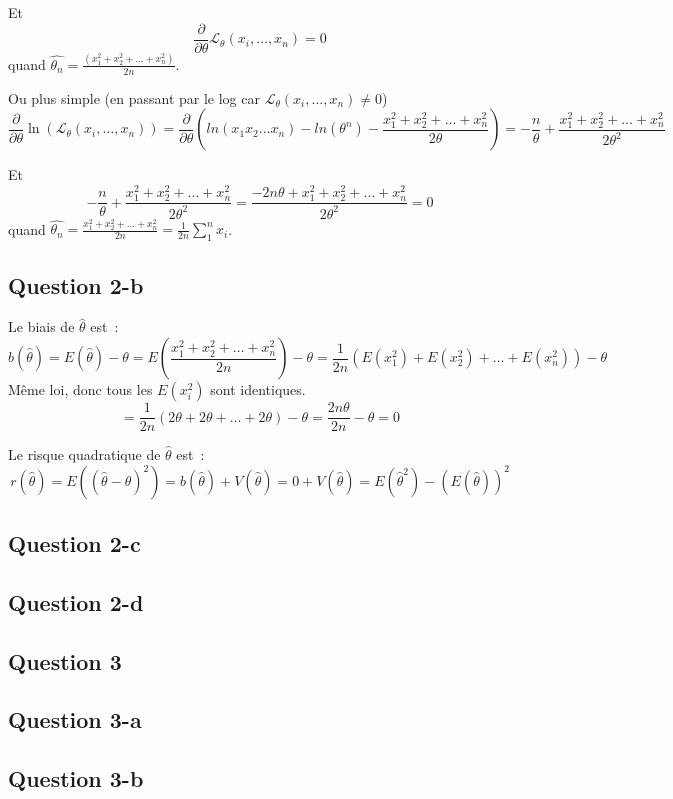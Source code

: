 \documentclass[]{book}
\theoremstyle{definition}
\begin{document}
Et
$$
\frac{\partial}{\partial \theta} \mathcal{L}_{\theta}(x_i,\ldots,x_n) = 0
$$
quand $\hat{\theta_n} = \frac{(x_1^2+x_2^2+\ldots + x_n^2)}{2n}$.

Ou plus simple (en passant par le log car $\mathcal{L}_{\theta}(x_i,\ldots,x_n) \neq 0$)
$$
\frac{\partial}{\partial \theta} \ln(\mathcal{L}_{\theta}(x_i,\ldots,x_n)) = \frac{\partial}{\partial \theta} \left( ln(x_1x_2 \ldots x_n) - ln(\theta^n)  -  \frac{x_1^2+x_2^2+ \ldots + x_n^2}{2\theta} \right) = -\frac{n}{\theta} + \frac{x_1^2+x_2^2+ \ldots + x_n^2}{2\theta^2}
$$

Et
$$
-\frac{n}{\theta}+\frac{x_1^2+x_2^2+ \ldots + x_n^2}{2\theta^2} = \frac{-2n\theta + x_1^2+x_2^2+ \ldots + x_n^2}{2\theta^2} = 0
$$
quand $\hat{\theta_n} = \frac{x_1^2+x_2^2+\ldots + x_n^2}{2n} = \frac{1}{2n} \sum_{1}^{n}{x_i}$.

\subsection*{Question 2-b}
Le biais de $\hat{\theta}$ est~:
$$
b(\hat{\theta}) = E(\hat{\theta}) - \theta = E\left(\frac{x_1^2+x_2^2+\ldots + x_n^2}{2n}\right) - \theta = \frac{1}{2n}(E(x_1^2) + E(x_2^2) + \ldots + E(x_n^2)) - \theta
$$
M\^eme loi, donc tous les $E(x_i^2)$ sont identiques. 
$$
=\frac{1}{2n}(2\theta + 2\theta + \ldots + 2\theta) - \theta = \frac{2n\theta}{2n} - \theta = 0
$$

Le risque quadratique de $\hat{\theta}$ est~:
$$
r(\hat{\theta}) = E((\hat{\theta} - \theta)^2) = b(\hat{\theta}) + V(\hat{\theta}) = 0 + V(\hat{\theta}) = E(\hat{\theta}^2) - (E(\hat{\theta}))^2
$$

\subsection*{Question 2-c}

\subsection*{Question 2-d}

\subsection*{Question 3}
\subsection*{Question 3-a}
\subsection*{Question 3-b}
\end{document}

